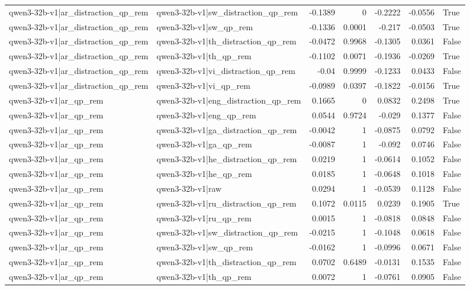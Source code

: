 \begin{table}
\begin{tabular}{l l r r r r l}
qwen3-32b-v1|ar_distraction_qp_rem & qwen3-32b-v1|sw_distraction_qp_rem & -0.1389 & 0 & -0.2222 & -0.0556 & True \\
qwen3-32b-v1|ar_distraction_qp_rem & qwen3-32b-v1|sw_qp_rem & -0.1336 & 0.0001 & -0.217 & -0.0503 & True \\
qwen3-32b-v1|ar_distraction_qp_rem & qwen3-32b-v1|th_distraction_qp_rem & -0.0472 & 0.9968 & -0.1305 & 0.0361 & False \\
qwen3-32b-v1|ar_distraction_qp_rem & qwen3-32b-v1|th_qp_rem & -0.1102 & 0.0071 & -0.1936 & -0.0269 & True \\
qwen3-32b-v1|ar_distraction_qp_rem & qwen3-32b-v1|vi_distraction_qp_rem & -0.04 & 0.9999 & -0.1233 & 0.0433 & False \\
qwen3-32b-v1|ar_distraction_qp_rem & qwen3-32b-v1|vi_qp_rem & -0.0989 & 0.0397 & -0.1822 & -0.0156 & True \\
qwen3-32b-v1|ar_qp_rem & qwen3-32b-v1|eng_distraction_qp_rem & 0.1665 & 0 & 0.0832 & 0.2498 & True \\
qwen3-32b-v1|ar_qp_rem & qwen3-32b-v1|eng_qp_rem & 0.0544 & 0.9724 & -0.029 & 0.1377 & False \\
qwen3-32b-v1|ar_qp_rem & qwen3-32b-v1|ga_distraction_qp_rem & -0.0042 & 1 & -0.0875 & 0.0792 & False \\
qwen3-32b-v1|ar_qp_rem & qwen3-32b-v1|ga_qp_rem & -0.0087 & 1 & -0.092 & 0.0746 & False \\
qwen3-32b-v1|ar_qp_rem & qwen3-32b-v1|he_distraction_qp_rem & 0.0219 & 1 & -0.0614 & 0.1052 & False \\
qwen3-32b-v1|ar_qp_rem & qwen3-32b-v1|he_qp_rem & 0.0185 & 1 & -0.0648 & 0.1018 & False \\
qwen3-32b-v1|ar_qp_rem & qwen3-32b-v1|raw & 0.0294 & 1 & -0.0539 & 0.1128 & False \\
qwen3-32b-v1|ar_qp_rem & qwen3-32b-v1|ru_distraction_qp_rem & 0.1072 & 0.0115 & 0.0239 & 0.1905 & True \\
qwen3-32b-v1|ar_qp_rem & qwen3-32b-v1|ru_qp_rem & 0.0015 & 1 & -0.0818 & 0.0848 & False \\
qwen3-32b-v1|ar_qp_rem & qwen3-32b-v1|sw_distraction_qp_rem & -0.0215 & 1 & -0.1048 & 0.0618 & False \\
qwen3-32b-v1|ar_qp_rem & qwen3-32b-v1|sw_qp_rem & -0.0162 & 1 & -0.0996 & 0.0671 & False \\
qwen3-32b-v1|ar_qp_rem & qwen3-32b-v1|th_distraction_qp_rem & 0.0702 & 0.6489 & -0.0131 & 0.1535 & False \\
qwen3-32b-v1|ar_qp_rem & qwen3-32b-v1|th_qp_rem & 0.0072 & 1 & -0.0761 & 0.0905 & False \\

\end{tabular}
\end{table}
